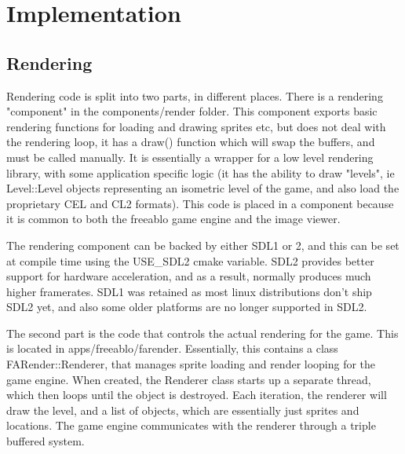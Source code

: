 \chapter{Implementation}

 \section{Rendering}  
    Rendering code is split into two parts, in different places. There is a rendering "component" in the components/render folder.
    This component exports basic rendering functions for loading and drawing sprites etc, but does not deal with the rendering loop, it has a draw() function which will swap the buffers, and must be called manually.   
    It is essentially a wrapper for a low level rendering library, with some application specific logic (it has the ability to draw "levels", ie Level::Level objects representing an isometric level of the game, and also load the proprietary CEL and CL2 formats).
    This code is placed in a component because it is common to both the freeablo game engine and the image viewer.
    
    The rendering component can be backed by either SDL1 or 2, and this can be set at compile time using the USE\_SDL2 cmake variable. SDL2 provides better support for hardware acceleration, and as a result, normally produces much higher framerates. SDL1 was retained as most linux distributions don't ship SDL2 yet, and also some older platforms are no longer supported in SDL2.
    
    \mbox{}
    
    The second part is the code that controls the actual rendering for the game. This is located in apps/freeablo/farender. Essentially, this contains a class FARender::Renderer, that manages sprite loading and render looping for the game engine.  
    When created, the Renderer class starts up a separate thread, which then loops until the object is destroyed. Each iteration, the renderer will draw the level, and a list of objects, which are essentially just sprites and locations.
    The game engine communicates with the renderer through a triple buffered system.
    
